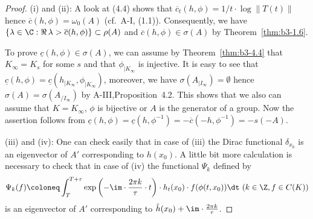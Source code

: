 \begin{proof}	
	(i) and (ii): A look at (4.4) shows that $\overline{c}_{t}(h,\phi) = 1/t\cdot\log\|T(t)\|$ hence $\overline{c}(h,\phi) = \omega_{0}(A)$ (cf.\ A-I, (1.1)).  
	Consequently, we have $\{\lambda \in \C : \Re\,\lambda  > \overline{c}(h,\phi)\} \subset \rho(A)$ and $\overline{c}(h,\phi) \in \sigma(A)$ by Theorem~\ref{thm:b3-1.6}.
	
	To prove $\underline{c}(h,\phi) \in \sigma(A)$, we can assume by Theorem~\ref{thm:b3-4.4} that $K_{\infty} = K_{s}$ for some $s$ and that $\phi_{|K_{\infty}}$ is injective.
	It is easy to see that $\underline{c}(h,\phi) = \underline{c}(h_{|K_{\infty}},\phi_{|K_{\infty}})$, moreover, we have $\sigma(A_{|I_{\infty}}) = \emptyset$ hence $\sigma(A) = \sigma(A_{/I_{\infty}})$ by A-III,Proposition~4.2.
	This shows that we also can assume that $K = K_{\infty}$, \ie $\phi$ is bijective or $A$ is the generator of a group.
	Now the assertion follows from $\underline{c}(h,\phi) = \underline{c}(h,\phi^{-1}) = -\overline{c}(-h,\phi^{-1}) = -s(-A)$.
	
	(iii) and (iv): One can check easily that in case of (iii) the Dirac functional $\delta_{x_{0}}$ is an eigenvector of $A'$ corresponding to $h(x_{0})$.
%
%
A little bit more calculation is necessary to check that in case of (iv) the functional $\Psi_{k}$ defined by
\[
	\Psi_{k}(f) \coloneq \int_{T}^{T+\tau} \exp\left(-\im\cdot\frac{2\pi k}{\tau}\cdot t\right)\cdot h_{t}(x_{0})\cdot f(\phi(t,x_{0})) \dt  \ (k \in \Z, f \in C(K))
\]
is an eigenvector of $A'$ corresponding to $\hat{h}(x_{0}) + \im\cdot\frac{2\pi k}{\tau}$.


\end{proof}
